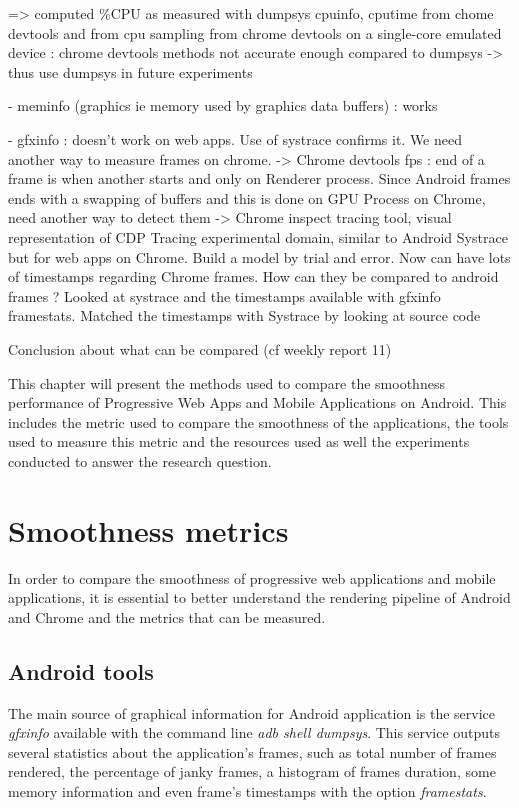\documentclass{kththesis}
\begin{document}
        => computed \%CPU as measured with dumpsys cpuinfo, cputime from chome devtools and from cpu sampling from chrome devtools on a single-core emulated device : chrome devtools methods not accurate enough compared to dumpsys -> thus use dumpsys in future experiments
        
        
    - meminfo (graphics ie  memory used by graphics data buffers) : works
    
    - gfxinfo : doesn't work on web apps. Use of systrace confirms it. We need another way to measure frames on chrome. 
        -> Chrome devtools fps : end of a frame is when another starts and only on Renderer process. Since Android frames ends with a swapping of buffers and this is done on GPU Process on Chrome, need another way to detect them
        -> Chrome inspect tracing tool, visual representation of CDP Tracing experimental domain,  similar to Android Systrace but for web apps on Chrome. Build a model by trial and error. Now can have lots of timestamps regarding Chrome frames. How can they be compared to android frames ? Looked at systrace and the timestamps available with gfxinfo framestats. Matched the timestamps with Systrace by looking at source code
        
        Conclusion about what can be compared (cf weekly report 11)
\fi

This chapter will present the methods used to compare the smoothness performance of Progressive Web Apps and Mobile Applications on Android. This includes the metric used to compare the smoothness of the applications, the tools used to measure this metric and the resources used as well the experiments conducted to answer the research question.  

\section{Smoothness metrics}
    
    In order to compare the smoothness of progressive web applications and mobile applications, it is essential to better understand the rendering pipeline of Android and Chrome and the metrics that can be measured.
    
    \subsection{Android tools}
        
    The main source of graphical information for Android application is the service \textit{gfxinfo} available with the command line \textit{adb shell dumpsys}. This service outputs several statistics about the application's frames, such as total number of frames rendered, the percentage of janky frames, a histogram of frames duration, some memory information and even frame's timestamps with the option \textit{framestats}.
    
\end{document}
